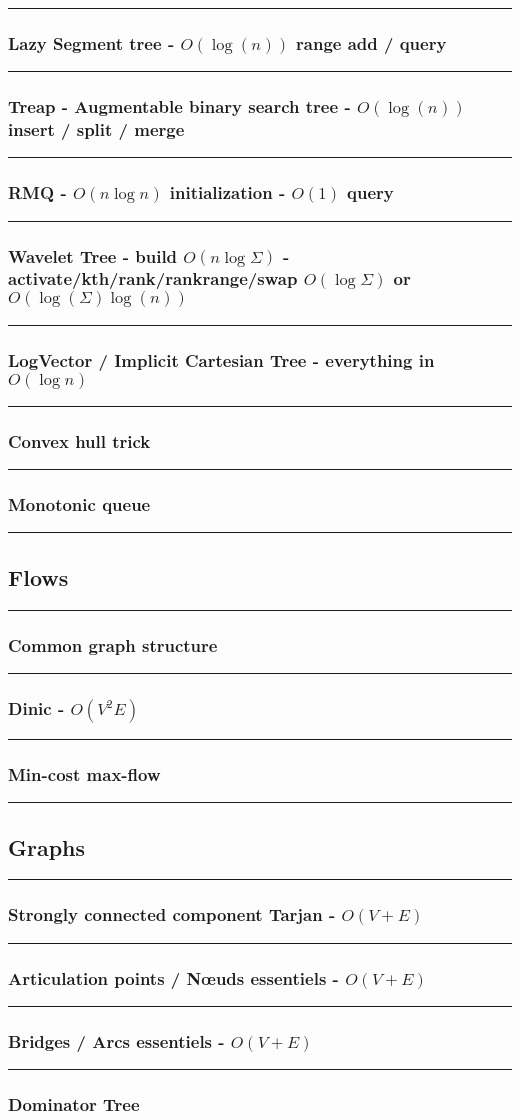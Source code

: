 \documentclass[landscape,a4paper,twocolumn,10pt]{report}
\renewcommand{\line}{\noindent\rule{\linewidth}{1pt}}
\newcommand{\algosection}[1]{\line \subsection*{#1}}
\newcommand{\algorithm}[1]{\line \subsubsection*{#1}}
\begin{document}
\algorithm{Lazy Segment tree - $O(\log(n))$ range add / query}


\algorithm{Treap - Augmentable binary search tree - $O(\log(n))$ insert / split / merge}


%

\algorithm{RMQ - $O(n \log n)$ initialization - $O(1)$ query}


\algorithm{Wavelet Tree - build $O(n \log \Sigma)$ - activate/kth/rank/rankrange/swap $O(\log \Sigma)$ or $O(\log(\Sigma) \log(n))$}


\algorithm{LogVector / Implicit Cartesian Tree - everything in $O(\log n)$}


\algorithm{Convex hull trick}


\algorithm{Monotonic queue}


\algosection{Flows}
\label{flows}

\algorithm{Common graph structure}


\algorithm{Dinic - $O(V^2 E)$}


% 

\algorithm{Min-cost max-flow}



\algosection{Graphs}
\label{graphs}

\algorithm{Strongly connected component Tarjan - $O(V + E)$}


%

\algorithm{Articulation points / N\oe uds essentiels - $O(V + E)$}


\algorithm{Bridges / Arcs essentiels - $O(V + E)$}


\algorithm{Dominator Tree}

\end{document}
